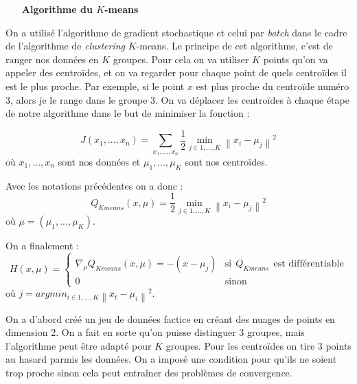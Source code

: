 \documentclass{article}
\begin{document}
\begin{itemize}
    \item [\textbf{Algorithme du $K$-means}]
\end{itemize}
\bigskip

On a utilisé l'algorithme de gradient stochastique et celui par \emph{batch} dans le cadre de l'algorithme de \emph{clustering} $K$-means. Le principe de cet algorithme, c'est de ranger nos données en $K$ groupes. Pour cela on va utiliser $K$ points qu'on va appeler des centroïdes, et on va regarder pour chaque point de quels centroïdes il est le plus proche. Par exemple, si le point $x$ est plus proche du centroïde numéro 3, alors je le range dans le groupe 3. On va déplacer les centroïdes à chaque étape de notre algorithme dans le but de minimiser la fonction :
\bigskip

\begin{equation*}
J(x_1,...,x_n)= \displaystyle\sum_{x_1,...,x_n}\frac{1}{2}\displaystyle\min_{j\in{1,...,K}}\left\|x_i-\mu_j\right\|^2  
\end{equation*}
où $x_1,...,x_n$ sont nos données et $\mu_1,...,\mu_K$ sont nos centroïdes.
\bigskip 

Avec les notations précédentes on a donc :
\begin{equation*}
    Q_{Kmeans}(x,\mu)=\frac{1}{2}\displaystyle\min_{j\in{1,...,K}}\left\|x_i-\mu_j\right\|^2
\end{equation*}
où $\mu=(\mu_1,...,\mu_K).$
\bigskip 

On a finalement : 
\begin{equation*}
    H(x,\mu)=\left\{
    \begin{array}{ll}
    \nabla_\mu Q_{Kmeans}(x,\mu)=-(x-\mu_j)     & \text{si}~~Q_{Kmeans}~~\text{est différentiable}\\
       0  & \text{sinon}
    \end{array}
    \right.
\end{equation*}
où  $j=\displaystyle argmin_{i\in{1,...,K}}\left\|x_t-\mu_i\right\|^2$.
\bigskip

On a d'abord créé un jeu de données factice en créant des nuages de points en dimension 2. On a fait en sorte qu'on puisse distinguer 3 groupes, mais l'algorithme peut être adapté pour $K$ groupes. Pour les centroïdes on tire 3 points au hasard parmis les données. On a imposé une condition pour qu'ils ne soient trop proche sinon cela peut entraîner des problèmes de convergence.
\bigskip
\end{document}
